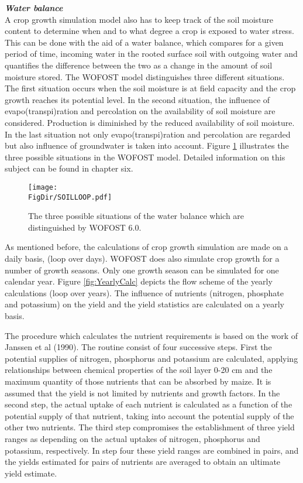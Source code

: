 {\bf {\it Water balance}}\\
A crop growth simulation model also has to keep track of the soil moisture content to
deter\-mine when and to what degree a crop is exposed to water stress. This can be done
with the aid of a water balance, which com\-pares for a given period of time, incoming
water in the rooted surface soil with outgoing water and quantifies the difference between
the two as a change in the amount of soil moisture stored. The WOFOST model distin\-guishes 
three different situations. The first situation occurs when the soil moisture is at
field capacity and the crop growth reaches its potential level. In the second situation, the
influence of evapo(transpi)rati\-on and percolation on the availability of soil moisture are
considered. Production is dimin\-ished by the reduced availability of soil moisture. In the
last situation not only evapo(transpi)ration and percola\-tion are regarded but also influence
of groundwater is taken into account. Figure \ref{fig:waterbalances} illustrates the 
three possible situations in
the WOFOST model. Detailed information on this subject can be found in chapter six.

\begin{figure}[htbp]
\centering
\texttt{[image: \\FigDir/SOILLOOP.pdf]}
\caption{The three possible situations of the water balance which are distin\-guished
by WOFOST 6.0.}
\label{fig:waterbalances}
\end{figure}

As mentioned before, the calculations of crop growth simulation are made on a daily
basis, (loop over days). WOFOST does also simulate crop growth for a number of growth
seasons. Only one growth season can be simulated for one cal\-endar year. Figure \ref{fig:YearlyCalc}
depicts the flow scheme of the yearly calculations (loop over years). The influ\-ence of
nutrients (nitrogen, phos\-phate and potassi\-um) on the yield and the yield statistics are
calculated on a yearly basis.

The procedure which calculates the nutrient requirements is based on the work of Janssen
et al (1990). The routine consist of four successive steps. First the potential supplies of
nitrogen, phosphorus and potassium are calculated, applying relationships between
chemical properties of the soil layer 0-20 cm and the maximum quantity of those nutrients
that can be absorbed by maize. It is assumed that the yield is not limited by nutrients and
growth factors. In the second step, the actual uptake of each nutrient is calculated as a
function of the potential supply of that nutrient, taking into account the potential supply of
the other two nutrients. The third step compromises the establishment of three yield
ranges as depending on the actual uptakes of nitrogen, phosphorus and potassium,
respectively. In step four these yield ranges are combined in pairs, and the yields
estimated for pairs of nutrients are averaged to obtain an ultimate yield estimate.

